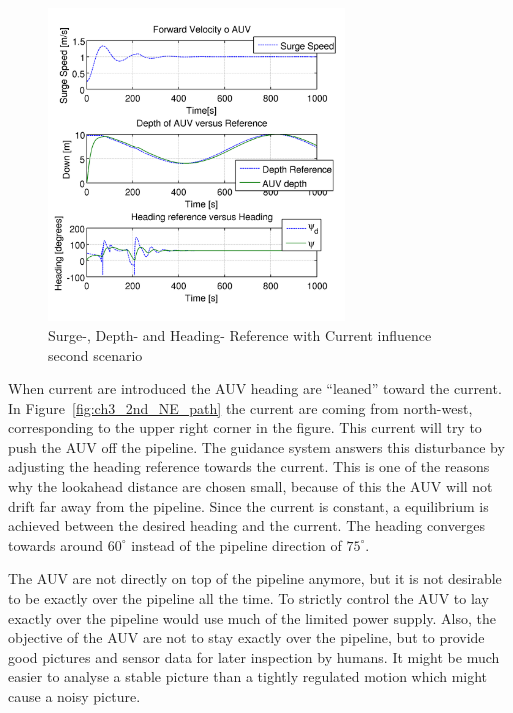 		\begin{figure}[htbp]
			\centering
			\includegraphics[width=0.70\textwidth]{pics/2nd_uDpsi}
			\caption[Reference plots for the 2nd scenario]{Surge-, Depth- and Heading- 
			Reference with Current influence second scenario}
			\label{fig:ch3_2nd_uDpsi}
		\end{figure}
		When current are introduced the AUV heading are ``leaned'' toward the current. In
		Figure~\ref{fig:ch3_2nd_NE_path} the current are coming from north-west, corresponding to
		the upper right corner in the figure. This current will try to push the
		AUV off the pipeline. The guidance system answers this disturbance by adjusting the heading
		reference towards the current. This is one of the reasons why the lookahead distance are
		chosen small, because of this the AUV will not drift far away from the pipeline. Since the
		current is constant, a equilibrium is achieved between the desired heading and the
		current. The heading converges towards around $60^{\circ}$ instead of the pipeline direction
		of $75^{\circ}$.

		The AUV are not directly on top of the pipeline anymore, but it is not desirable to be exactly
		over the pipeline all the time. To strictly control the AUV to lay exactly over the pipeline
		would use much of the limited power supply. Also, the objective of the AUV are not to stay
		exactly over the pipeline, but to provide good pictures and sensor data for later inspection 
		by humans. It might be much easier to analyse a stable picture than a tightly regulated
		motion which might cause a noisy picture. 

	

